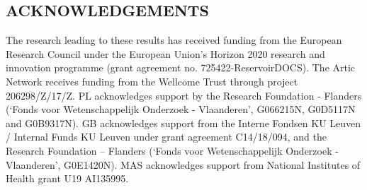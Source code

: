 \documentclass{article}
\begin{document}
\begin{multicols}{2}
\section*{ACKNOWLEDGEMENTS}

The research leading to these results has received funding from the European Research Council under the European Union's Horizon 2020 research and innovation programme (grant agreement no. 725422-ReservoirDOCS).
The Artic Network receives funding from the Wellcome Trust through project 206298/Z/17/Z.
PL acknowledges support by the Research Foundation - Flanders (‘Fonds voor Wetenschappelijk Onderzoek - Vlaanderen’, G066215N, G0D5117N and G0B9317N).
GB acknowledges support from the Interne Fondsen KU Leuven / Internal Funds KU Leuven under grant agreement C14/18/094, and the Research Foundation -- Flanders (‘Fonds voor Wetenschappelijk Onderzoek - Vlaanderen’, G0E1420N).
MAS acknowledges support from National Institutes of Health grant U19 AI135995.






\end{multicols}
\end{document}
